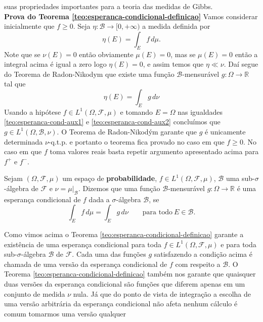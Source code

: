 suas propriedades importantes para a teoria das medidas de Gibbs.
\\[0.2cm]
{\bf Prova do Teorema \eqref{teo:esperanca-condicional-definicao}} 
Vamos considerar inicialmente que $f\geq 0$. Seja $\eta:\mathcal{B}\to[0,+\infty)$ a medida definida por 
\begin{equation}\label{teo:esperanca-cond-aux1}
\eta(E)=\int_{E} f\, d\mu.
\end{equation}
Note que se $\nu(E)=0$ então obviamente $\mu(E)=0$, mas se $\mu(E)=0$ então a integral acima é igual a zero logo
$\eta(E)=0$, e assim temos que $\eta\ll\nu$. Daí segue do Teorema de Radon-Nikodym que existe uma função 
$\mathcal{B}$-mensurável $g:\Omega\to\mathbb{R}$ tal que 
\begin{equation}
\label{teo:esperanca-cond-aux2}
\eta(E)=\int_{E} g\, d\nu
\end{equation}
Usando a hipótese $f\in L^1(\Omega,\mathcal{F},\mu)$ e tomando $E=\Omega$ nas igualdades \eqref{teo:esperanca-cond-aux1} e \eqref{teo:esperanca-cond-aux2} 
concluímos que $g\in L^1(\Omega,\mathcal{B},\nu)$. O Teorema de Radon-Nikodým garante que $g$ é unicamente determinada $\nu$-q.t.p. 
e portanto o teorema fica provado no caso em que $f\geq 0$.
No caso em que $f$ toma valores reais basta repetir argumento apresentado acima para $f^{+}$ e $f^{-}$.
\bigskip 
\begin{definicao} 
Sejam $(\Omega,\mathcal{F},\mu)$ um espaço de {\bf probabilidade}, 
$f\in L^1(\Omega,\mathcal{F},\mu)$, $\mathcal{B}$ uma sub-$\sigma$-álgebra de $\mathcal{F}$ e $\nu=\mu|_{\mathcal{B}}$. 
Dizemos que uma função $\mathcal{B}$-mensurável $g:\Omega\to\mathbb{R}$ é uma esperança condicional
de $f$ dada a $\sigma$-álgebra $\mathcal{B}$, se 
$$
\int_{E} f\, d\mu =\int_{E} g\, d\nu \qquad \text{para todo} \ E\in\mathcal{B}.
$$
\end{definicao}
Como vimos acima o Teorema \eqref{teo:esperanca-condicional-definicao} garante a existência de uma esperança condicional para toda 
$f\in L^1(\Omega,\mathcal{F},\mu)$ e para toda sub-$\sigma$-álgebra $\mathcal{B}$ de $\mathcal{F}$. Cada uma das funções $g$ satisfazendo 
a condição acima é chamada de uma versão da esperança condicional de $f$ com respeito a $\mathcal{B}$. 
O Teorema \eqref{teo:esperanca-condicional-definicao} também nos garante que quaisquer duas versões da esperança condicional 
são funções que diferem apenas em um conjunto de medida $\nu$ nula. Já que do ponto de vista de integração 
a escolha de uma versão arbitrária da esperança condicional não afeta nenhum cálculo é comum tomarmos uma versão qualquer
